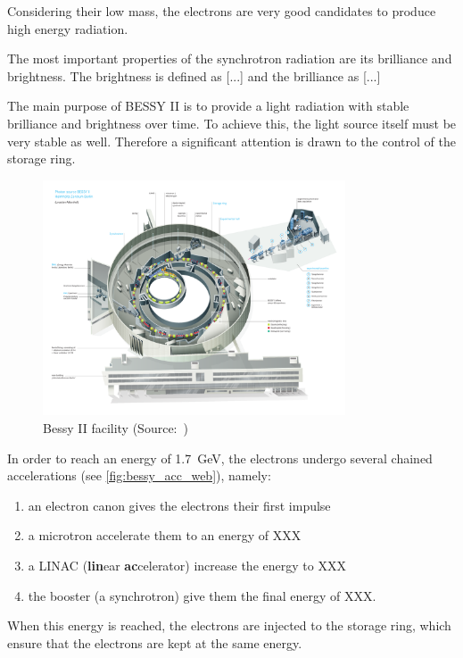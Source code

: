 Considering their low mass, the electrons are very good candidates to produce high energy radiation.

The most important properties of the synchrotron radiation are its brilliance and brightness.  The brightness is defined as [...] and the brilliance as [...]

The main purpose of BESSY II is to provide a light radiation with stable brilliance and brightness over time. To achieve this, the light source itself must be very stable as well. Therefore a significant attention is drawn to the control of the storage ring.

\begin{figure}
    \centering
    \includegraphics[width=0.8\textwidth,height=0.8\textheight,keepaspectratio]{img/bessy_acc_web.pdf}
    \caption[Bessy II facility]{\label{fig:bessy_acc_web} Bessy II facility (Source:~\cite{web:bessy_homepage})}
\end{figure}

In order to reach an energy of 1.7~GeV, the electrons undergo several chained accelerations (see \autoref{fig:bessy_acc_web}), namely:
\begin{enumerate}
    \item an electron canon gives the electrons their first impulse
    \item a microtron accelerate them to an energy of XXX
    \item a LINAC (\textbf{lin}ear \textbf{ac}celerator) increase the energy to XXX
    \item the booster (a synchrotron) give them the final energy of XXX.
\end{enumerate}

When this energy is reached, the electrons are injected to the storage ring, which ensure that the electrons are kept at the same energy.

